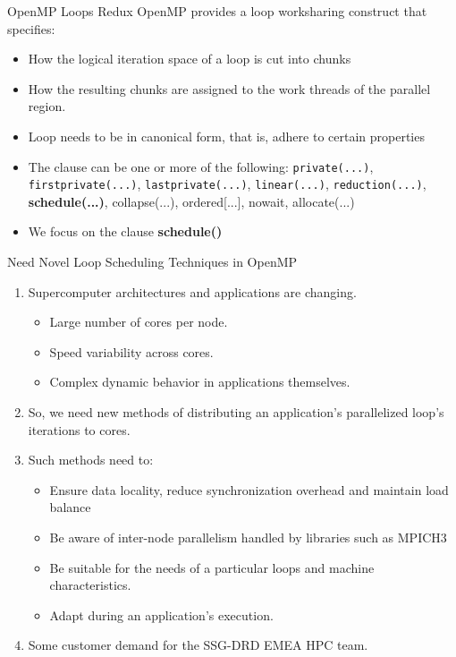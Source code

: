 \begin{frame}{OpenMP Loops Redux}
OpenMP provides a loop worksharing construct that specifies: 
\begin{itemize}
\item How the logical iteration space of a loop is cut into chunks
\item How the resulting chunks are assigned to the work threads of the parallel region.
\end{itemize}
  

\begin{itemize}
\item Loop needs to be in canonical form, that is, adhere to certain properties
\item The clause can be one or more of the following: \texttt{private(...)}, \texttt{firstprivate(...)}, \texttt{lastprivate(...)}, \texttt{linear(...)}, \texttt{reduction(...)}, \textbf{schedule(...)}, collapse(...), ordered[...], nowait, allocate(...) 
\item We focus on the clause \textbf{schedule()}
\end{itemize}

\end{frame}

\begin{frame}{Need Novel Loop Scheduling Techniques in OpenMP}

\begin{enumerate}
\item Supercomputer architectures and applications are changing.
\begin{itemize}
\small \item \small Large number of cores per node.
\item \small Speed variability across cores.
\item \small Complex dynamic behavior in applications themselves.
\end{itemize}
\item So, we need new methods of distributing an application’s parallelized loop's iterations to cores.
\item Such methods need to: 
\begin{itemize}
\small \item \small Ensure data locality, reduce synchronization overhead and maintain load balance~%
\item \small Be aware of inter-node parallelism handled by libraries such as MPICH3~%
\item \small Be suitable for the needs of a particular loops and machine characteristics.
\item \small Adapt during an application's execution.
\end{itemize}
\item Some customer demand for the SSG-DRD EMEA HPC team.
\end{enumerate}
\end{frame}




